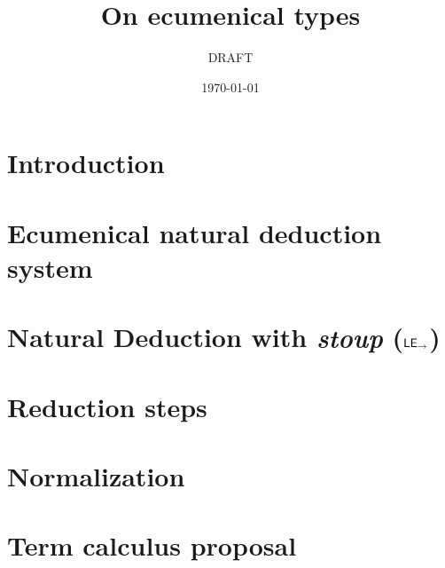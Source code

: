 \documentclass{article}
\date{\today}
\title{On ecumenical types}
\author{DRAFT}
\begin{document}
\maketitle

\section{Introduction}\label{sec:intro}


\section{Ecumenical natural deduction system}\label{sec:ec}


\section{Natural Deduction with \textit{stoup} ($\mathsf{LE}_{\to}$)}\label{sec:nd}


\section{Reduction steps}\label{sec:red}



\section{Normalization}\label{sec:norm}
%

\section{Term calculus proposal}\label{sec:types}




\end{document}
